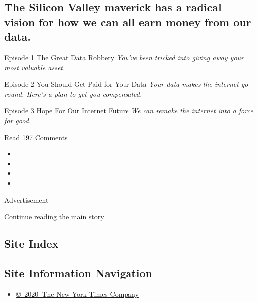 \hypertarget{the-silicon-valley-maverick-has-a-radical-vision-for-how-we-can-all-earn-money-from-our-data}{%
\subsection{The Silicon Valley maverick has a radical vision for how we
can all earn money from our
data.}\label{the-silicon-valley-maverick-has-a-radical-vision-for-how-we-can-all-earn-money-from-our-data}}

 Episode 1 The Great Data Robbery \emph{You've been tricked into giving
away your most valuable asset.}

 Episode 2 You Should Get Paid for Your Data \emph{Your data makes the
internet go round. Here's a plan to get you compensated.}

 Episode 3 Hope For Our Internet Future \emph{We can remake the internet
into a force for good.}

Read 197 Comments

\begin{itemize}
\item
\item
\item
\item
\end{itemize}

Advertisement

\protect\hyperlink{after-bottom}{Continue reading the main story}

\hypertarget{site-index}{%
\subsection{Site Index}\label{site-index}}

\hypertarget{site-information-navigation}{%
\subsection{Site Information
Navigation}\label{site-information-navigation}}

\begin{itemize}
\tightlist
\item
  \href{https://help.nytimes.com/hc/en-us/articles/115014792127-Copyright-notice}{©~2020~The
  New York Times Company}
\end{itemize}

